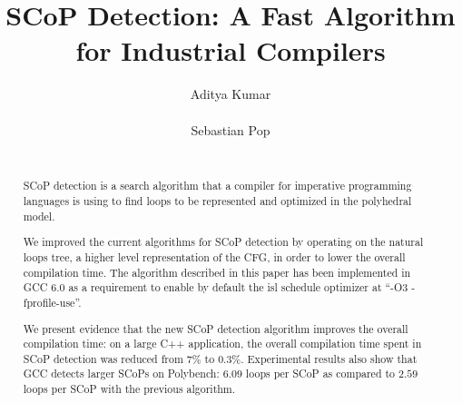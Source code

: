 \documentclass{sig-alternate}
\begin{document}
\def \SCoP {SCoP}

\setlength{\pdfpageheight}{\paperheight}
\setlength{\pdfpagewidth}{\paperwidth}

\title{\SCoP{} Detection: A Fast Algorithm for Industrial Compilers}


\author{
\alignauthor
Aditya Kumar\\
       \\
\alignauthor
Sebastian Pop\\
       \\
}

\maketitle

\begin{abstract}
\SCoP{} detection is a search algorithm that a compiler for imperative programming
languages is using to find loops to be represented and optimized in the
polyhedral model.

We improved the current algorithms for \SCoP{} detection by operating on the
natural loops tree, a higher level representation of the CFG, in order to lower
the overall compilation time.  The algorithm described in this paper has been
implemented in GCC 6.0 as a requirement to enable by default the isl schedule
optimizer at ``-O3 -fprofile-use''.

We present evidence that the new \SCoP{} detection algorithm improves the overall
compilation time: on a large C++ application, the overall compilation time spent
in \SCoP{} detection was reduced from $7\%$ to $0.3\%$.  Experimental results also
show that GCC detects larger \SCoP{s} on Polybench: $6.09$ loops per \SCoP{} as
compared to $2.59$ loops per \SCoP{} with the previous algorithm.
\end{abstract}
\end{document}

